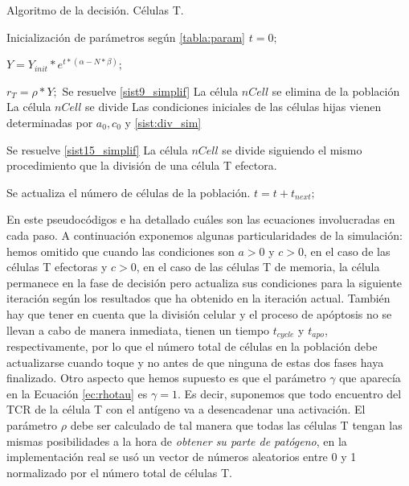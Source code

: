 \begin{algorithm}
	\caption{Algoritmo de la decisión. Células T.}
	\label{algo:pseudocodigo}
	\begin{algorithmic}[1]
		
		
		\State Inicialización de parámetros según \ref{tabla:param}
		\State $t = 0;$ 
		
		  
		\State $Y = Y_{init}*e^{t*(\alpha - N*\beta)};$ 
		
		 
			\State $ r_{T}=\rho*Y;$ 
			 
				\State Se resuelve \ref{sist9_simplif}
					\State La célula $nCell$ se elimina de la población
					\State La célula $nCell$ se divide
					\State Las condiciones iniciales de las células hijas vienen determinadas por $a_0, c_0$ y \ref{sist:div_sim}
				\EndIf
			
			 
				\State Se resuelve \ref{sist15_simplif}
					\State La célula $nCell$ se divide siguiendo el mismo procedimiento que la división de una célula T efectora. 
				\EndIf
			\EndIf
		\EndFor
		
		\State Se actualiza el número de células de la población.
		\State $t = t + t_{next};$
		
		\EndWhile
		
	\end{algorithmic}
\end{algorithm}

En este pseudocódigos e ha detallado cuáles son las ecuaciones involucradas en cada paso. A continuación exponemos algunas particularidades de la simulación: hemos omitido que cuando las condiciones son $a > 0$ y $c > 0$, en el caso de las células T efectoras y $c > 0$, en el caso de las células T de memoria, la célula permanece en la fase de decisión pero actualiza sus condiciones para la siguiente iteración según los resultados que ha obtenido en la iteración actual. También hay que tener en cuenta que la división celular y el proceso de apóptosis no se llevan a cabo de manera inmediata, tienen un tiempo $t_{cycle}$ y $t_{apo}$, respectivamente, por lo que el número total de células en la población debe actualizarse cuando toque y no antes de que ninguna de estas dos fases haya finalizado. Otro aspecto que hemos supuesto es que el parámetro $\gamma$ que aparecía en la Ecuación \ref{ec:rhotau} es $\gamma = 1$. Es decir, suponemos que todo encuentro del TCR de la célula T con el antígeno va a desencadenar una activación. El parámetro $\rho$ debe ser calculado de tal manera que todas las células T tengan las mismas posibilidades a la hora de \textit{obtener su parte de patógeno}, en la implementación real se usó un vector de números aleatorios entre 0 y 1 normalizado por el número total de células T.

